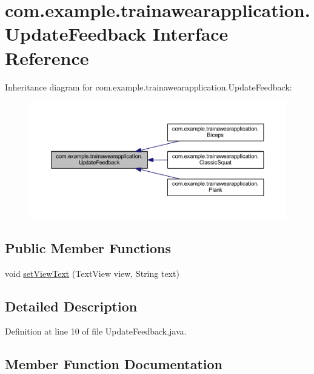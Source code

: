 \hypertarget{interfacecom_1_1example_1_1trainawearapplication_1_1_update_feedback}{}\section{com.\+example.\+trainawearapplication.\+Update\+Feedback Interface Reference}
\label{interfacecom_1_1example_1_1trainawearapplication_1_1_update_feedback}


Inheritance diagram for com.\+example.\+trainawearapplication.\+Update\+Feedback\+:
\nopagebreak
\begin{figure}[H]
\begin{center}
\leavevmode
\includegraphics[width=350pt]{interfacecom_1_1example_1_1trainawearapplication_1_1_update_feedback__inherit__graph}
\end{center}
\end{figure}
\subsection*{Public Member Functions}
\begin{DoxyCompactItemize}
\item 
void \mbox{\hyperlink{interfacecom_1_1example_1_1trainawearapplication_1_1_update_feedback_a7a026880188b11aca6d8184d57e699e8}{set\+View\+Text}} (Text\+View view, String text)
\end{DoxyCompactItemize}


\subsection{Detailed Description}


Definition at line 10 of file Update\+Feedback.\+java.



\subsection{Member Function Documentation}
\mbox{\label{interfacecom_1_1example_1_1trainawearapplication_1_1_update_feedback_a7a026880188b11aca6d8184d57e699e8}} 
